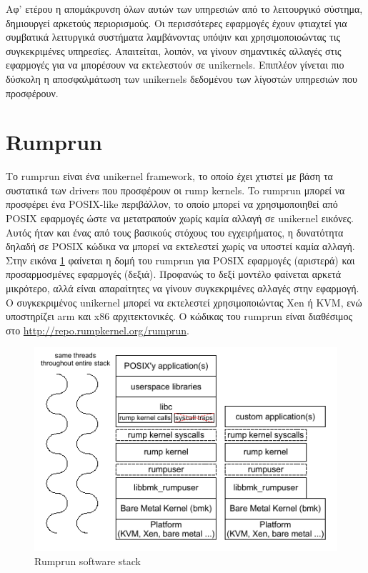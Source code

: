 Αφ' ετέρου η απομάκρυνση όλων αυτών των υπηρεσιών από το λειτουργικό σύστημα,
δημιουργεί αρκετούς περιορισμούς. Οι περισσότερες εφαρμογές έχουν φτιαχτεί για
συμβατικά λειτυργικά συστήματα λαμβάνοντας υπόψιν και χρησιμοποιοώντας τις
συγκεκριμένες υπηρεσίες. Απαιτείται, λοιπόν, να γίνουν σημαντικές αλλαγές στις
εφαρμογές για να μπορέσουν να εκτελεστούν σε unikernels. Επιπλέον γίνεται πιο
δύσκολη η αποσφαλμάτωση των unikernels δεδομένου των λίγοστών υπηρεσιών που
προσφέρουν. 

\section{Rumprun}
Το rumprun είναι ένα unikernel framework, το οποίο έχει χτιστεί με βάση τα
συστατικά των drivers που προσφέρουν οι rump kernels. 
To rumprun μπορεί να προσφέρει ένα POSIX-like περιβάλλον, το οποίο μπορεί να
χρησιμοποιηθεί από POSIX εφαρμογές ώστε να μετατραπούν χωρίς καμία αλλαγή σε
unikernel εικόνες. Αυτός ήταν και ένας από τους βασικούς στόχους του
εγχειρήματος, η δυνατότητα δηλαδή σε POSIX κώδικα να μπορεί να εκτελεστεί χωρίς
να υποστεί καμία αλλαγή. Στην εικόνα \ref{fig3_2} φαίνεται η δομή του rumprun
για POSIX εφαρμογές (αριστερά) και προσαρμοσμένες εφαρμογές (δεξιά). Προφανώς το
δεξί μοντέλο φαίνεται αρκετά μικρότερο, αλλά είναι απαραίτητες να γίνουν
συγκεκριμένες αλλαγές στην εφαρμογή. O συγκεκριμένος unikernel μπορεί να
εκτελεστεί χρησιμοποιώντας Xen ή KVM, ενώ υποστηρίζει arm και x86
αρχιτεκτονικές. Ο κώδικας του rumprun είναι διαθέσιμος στο
\url{http://repo.rumpkernel.org/rumprun}. 

\begin{figure}[htp]
\centering
\includegraphics[scale=0.75]{figures/rumprun_stack.png}
\caption{Rumprun software stack\label{fig3_2}}
\end{figure}

